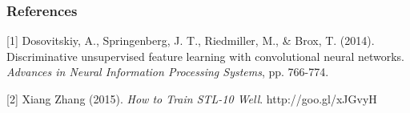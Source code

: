 \documentclass{article} %
\begin{document}
\subsubsection*{References}

\small{
[1] Dosovitskiy, A., Springenberg, J. T., Riedmiller, M., \& Brox, T. (2014). Discriminative unsupervised feature learning with convolutional neural networks. {\it Advances in Neural Information Processing Systems}, pp. 766-774.

[2] Xiang Zhang (2015). {\it How to Train STL-10 Well}. http://goo.gl/xJGvyH
}
\end{document}
